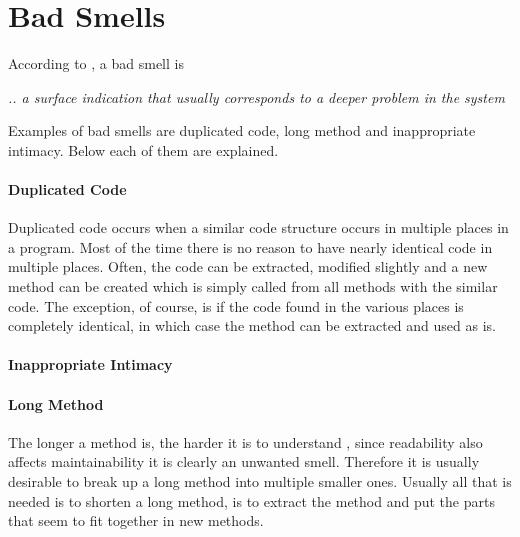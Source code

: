\section{Bad Smells}
According to \citet{code:smell}, a bad smell is 
\begin{center}
\textit{.. a surface indication that usually corresponds to a deeper problem in the system}
\end{center}

Examples of bad smells are duplicated code, long method and inappropriate intimacy. Below each of them are explained. 

\paragraph{Duplicated Code}
Duplicated code occurs when a similar code structure occurs in multiple places in a program. Most of the time there is no reason to have nearly identical code in multiple places. Often, the code can be extracted, modified slightly and a new method can be created which is simply called from all methods with the similar code. The exception, of course, is if the code found in the various places is completely identical, in which case the method can be extracted and used as is.
\paragraph{Inappropriate Intimacy}
\paragraph{Long Method}
The longer a method is, the harder it is to understand \citet[p. 64]{fowler:refac}, since readability also affects maintainability it is clearly an unwanted smell. Therefore it is usually desirable to break up a long method into multiple smaller ones. Usually all that is needed is to shorten a long method, is to extract the method and put the parts that seem to fit together in new methods.

